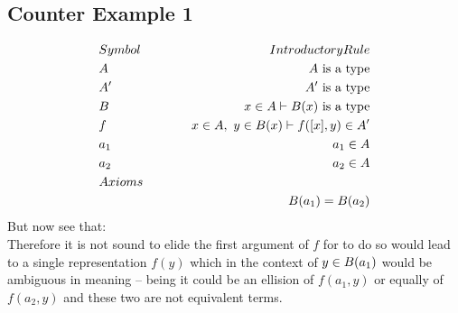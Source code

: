 \documentclass[10pt,a4paper,fleqn]{article}
\begin{document}
\subsection*{Counter Example 1}
			\noindent
			\begin{eqnarray}
		&Symbol&\hspace{1cm}Introductory Rule \nonumber \\
		&A \hspace{0.25cm}
		&\hspace{1cm}A\mbox{ is a type}\label{ex2-A} \\
		&A' \hspace{0.25cm}
		&\hspace{1cm}A'\mbox{ is a type}\label{ex2-A'} \\
		&B \hspace{0.25cm}
		&\hspace{1cm}x \in A\vdash B(x)\mbox{ is a type}\label{ex2-B} \\
		&f \hspace{0.25cm}
		&\hspace{1cm}x \in A,\ y \in B(x)\vdash f([x], y) \in A'\label{ex2-f} \\
		&a_1 \hspace{0.25cm}
		&\hspace{1cm}a_1 \in A\label{ex2-a_1} \\
		&a_2 \hspace{0.25cm}
		&\hspace{1cm}a_2 \in A\label{ex2-a_2} \\
		&Axioms&\nonumber \\
		&&B(a_1)=B(a_2)\label{ex2-axiom}
		\end{eqnarray} 
			\noindent
			But now see that: \\
			
		
		
		
		
	\noindent
Therefore it is not sound to elide the first argument of $f$ for to do so would lead to
		a single representation $f(y)$ which in the context of $y \in B(a_1)$ would be ambiguous 
		in meaning -- being it could be an ellision of $f(a_1,y)$ or equally of
		$f(a_2,y)$ and these two are not equivalent terms.
		
\end{document}

